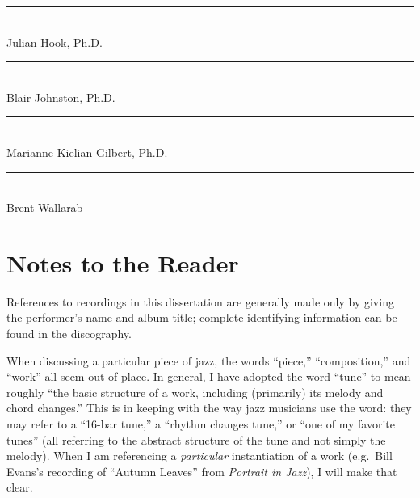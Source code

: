 {\flushright

\vspace{4em}

{\flushright \singlespacing

\vspace*{3em}
\rule{20em}{0.5pt} \\ Julian Hook, Ph.D.

\vspace{3em}
\rule{20em}{0.5pt} \\ Blair Johnston, Ph.D.

\vspace{3em}
\rule{20em}{0.5pt} \\ Marianne Kielian-Gilbert, Ph.D.

\vspace{3em}
\rule{20em}{0.5pt} \\ Brent Wallarab

}

\clearpage
{}
{}
\singlespacing
\tableofcontents

\clearpage
{}
{}
\listoffigures


\clearpage

{}
\listoftables

\clearpage

\section*{\Large Notes to the Reader}
\label{sec:notes-to-reader}

\singlespacing
References to recordings in this dissertation are generally made only by
giving the performer’s name and album title; complete identifying information
can be found in the discography.

When discussing a particular piece of jazz, the words “piece,” “composition,”
and “work” all seem out of place. In general, I have adopted the word “tune”
to mean roughly “the basic structure of a work, including (primarily) its
melody and chord changes.” This is in keeping with the way jazz musicians use
the word: they may refer to a ``16-bar tune,'' a “rhythm changes tune,” or “one
of my favorite tunes” (all referring to the abstract structure of the tune and
not simply the melody). When I am referencing a \emph{particular}
instantiation of a work (e.g.~Bill Evans’s recording of “Autumn Leaves” from
\emph{Portrait in Jazz}), I will make that clear.

}
